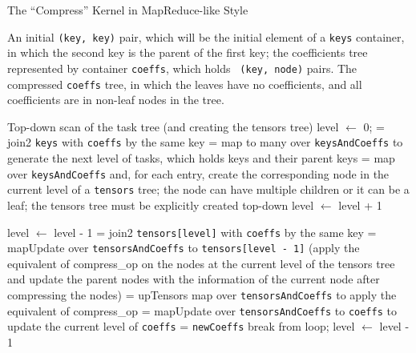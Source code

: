 \documentclass{article}
\begin{document}
\begin{algorithm}[H]
\caption{The ``Compress'' Kernel in MapReduce-like Style}
\label{alg:CompressMapReduce}
\begin{algorithmic}[1]

\REQUIRE An initial {\tt (key, key)} pair, which will be the initial element of
a {\tt keys} container, in which the second key is the parent of the first key;
the coefficients tree represented by container {\tt coeffs}, which holds {\tt
(key, node)} pairs.
\ENSURE The compressed {\tt coeffs} tree, in which the leaves have no coefficients,
and all coefficients are in non-leaf nodes in the tree.

\COMMENT Top-down scan of the task tree (and creating the tensors tree)
\STATE level $\leftarrow$ 0;
      = join2 {\tt keys} with {\tt coeffs} by the same key
      = map to many over {\tt keysAndCoeffs} to generate the next
                            level of tasks, which holds keys and their parent keys
      = map over {\tt keysAndCoeffs} and, for each entry,
                                   create the corresponding node in the current level
                                   of a {\tt tensors} tree; the node can have multiple
                                   children or it can be a leaf; the tensors tree must
                                   be explicitly created top-down
     \STATE level $\leftarrow$ level + 1
\ENDWHILE

\STATE level $\leftarrow$ level - 1
      = join2 {\tt tensors[level]} with {\tt coeffs}
                                     by the same key
        = mapUpdate over {\tt tensorsAndCoeffs} to {\tt tensors[level - 1]}
                                (apply the equivalent of compress\_op on the nodes at the
                                current level of the tensors tree and update the parent nodes
                                with the information of the current node after compressing the nodes)
        = upTensors
     \ELSE
       \STATE map over {\tt tensorsAndCoeffs} to apply the equivalent of compress\_op
     \ENDIF
      = mapUpdate over {\tt tensorsAndCoeffs} to {\tt coeffs}
                              to update the current level of {\tt coeffs}
      = {\tt newCoeffs}  
         \STATE break from loop;
     \ENDIF
     \STATE level $\leftarrow$ level - 1
\ENDWHILE

\end{algorithmic}
\end{algorithm}
\end{document}

